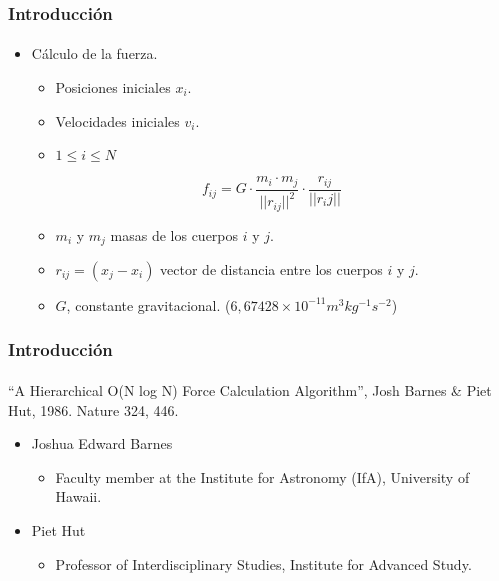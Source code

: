 \frame
{
\frametitle{Introducción}
\framesubtitle{}

\begin{itemize}
    \item Cálculo de la fuerza.
    \begin{itemize}
        \item Posiciones iniciales $x_i$.
        \item Velocidades iniciales $v_i$.
        \item $1 \leq i \leq N$
    \end{itemize}
    $$f_{ij} =G \cdot \frac{m_i \cdot m_j}{||r_{ij}||^{2}} \cdot \frac{r_{ij}}{||r_ij||}$$
    \begin{itemize}
        \item $m_i$ y $m_j$ masas de los cuerpos $i$ y $j$.
        \item $r_{ij} = (x_j - x_i )$ vector de distancia entre los cuerpos $i$ y $j$.
        \item $G$, constante gravitacional. ($6,67428 \times 10^{-11} m^{3} kg^{-1} s^{-2}$)
    \end{itemize}
\end{itemize}
}

\frame
{
\frametitle{Introducción}
\framesubtitle{}

\begin{center}
	``A Hierarchical O(N log N) Force Calculation Algorithm'', Josh Barnes \& Piet Hut, 1986. Nature 324, 446.
\end{center}
\begin{itemize}
	\item Joshua Edward Barnes
	\begin{itemize}
		\item Faculty member at the Institute for Astronomy (IfA), University of Hawaii.
	\end{itemize}
	\item Piet Hut
	\begin{itemize}
		\item Professor of Interdisciplinary Studies, Institute for Advanced Study.
	\end{itemize}
\end{itemize}
}

